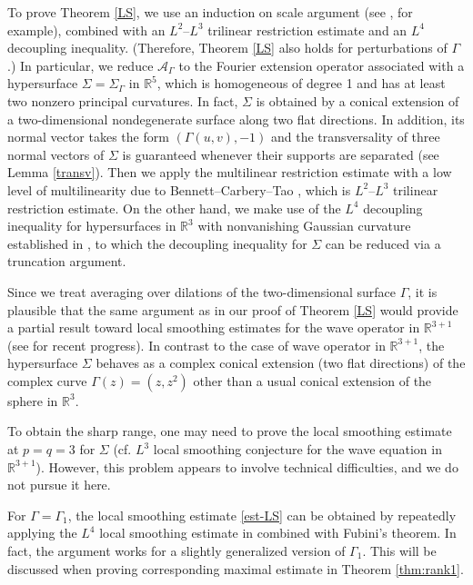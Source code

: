\documentclass[10pt] %
{amsart}
\theoremstyle{plain}
\numberwithin{equation}{section}
\begin{document}
To prove Theorem \ref{LS}, we use an induction on scale argument (see \cite{BG, HL, HKL2}, for example), combined with an $L^2$--$L^3$ trilinear restriction estimate and an $L^4$ decoupling inequality. (Therefore, Theorem \ref{LS} also holds for perturbations of $\Gamma$.)  
In particular, we reduce $\mathcal A_\Gamma$ to the Fourier extension operator associated with a hypersurface $\Sigma = \Sigma_\Gamma$ in $\mathbb R^5$, which is homogeneous of degree 1 and has at least two nonzero principal curvatures. 
In fact, $\Sigma$ is obtained by a conical extension of a two-dimensional nondegenerate surface along two flat directions. In addition, its normal vector takes the form $(\Gamma(u,v),-1)$ and the transversality of three normal vectors of $\Sigma$ is guaranteed whenever their supports are separated (see Lemma \ref{transv}).
Then we apply the multilinear restriction estimate with a low level of multilinearity due to Bennett--Carbery--Tao \cite{BCT}, which is $L^2$--$L^3$ trilinear restriction estimate.
On the other hand, we make use of the $L^4$ decoupling inequality for hypersurfaces in $\mathbb R^3$ with nonvanishing Gaussian curvature established in \cite{BD0,BD}, to which the decoupling inequality for $\Sigma$ can be reduced via a truncation argument.   


Since we treat averaging over dilations of the two-dimensional surface $\Gamma$, it is plausible that the same argument as in our proof of Theorem \ref{LS} would provide a partial result toward local smoothing estimates for the wave operator in $\mathbb R^{3+1}$  (see \cite{BS, GLMX, GW} for recent progress). 
In contrast to the case of wave operator in $\mathbb R^{3+1}$, the hypersurface $\Sigma$ behaves as a complex conical extension (two flat directions) of the complex curve $\Gamma(z) = (z,z^2)$  other than a  usual conical extension of the sphere in $\mathbb R^3$. 

To obtain the sharp range, one may need to prove the local smoothing estimate at $p=q=3$ for $\Sigma$ (cf. 
$L^3$ local smoothing conjecture for the wave equation in $\mathbb R^{3+1}$). However, this problem appears to involve technical difficulties, and we do not pursue it here.  

For $\Gamma = \Gamma_1$, the local smoothing estimate \eqref{est-LS} can be obtained by repeatedly applying the $L^4$ local smoothing estimate in \cite{GWZ} combined with Fubini's theorem. In fact, the argument works for a slightly generalized version of $\Gamma_1$. This will be discussed when proving corresponding maximal estimate in Theorem \ref{thm:rank1}.
\end{document}
